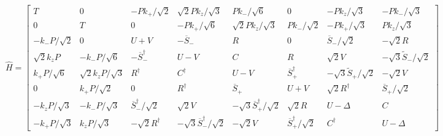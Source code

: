 \documentclass[a4paper, 14pt, russian]{extreport}
\newcommand{\kp}{k_{+}}
\newcommand{\km}{k_{-}}
\newcommand{\kz}{k_{z}}
\newcommand{\stp}{\overline{S}_{+}}
\newcommand{\stm}{\overline{S}_{-}}
\newcommand{\swp}{\widetilde{S}_{+}}
\newcommand{\swm}{\widetilde{S}_{-}}
\begin{document}
\begin{equation}
    \hat{H} =
        \begin{bmatrix}
            T       &   0       & -  P \kp  /\sqrt{2}   & \sqrt{2} P \kz / \sqrt{3} & P\km /\sqrt{6}        &   0       & -P\kz /\sqrt{3}   &   -P\km / \sqrt{3}\\
            0       &   T       &   0                   &   -P\kp /\sqrt{6}         &   \sqrt{2} P\kz / \sqrt{3}    &   P\km /\sqrt{2}  &   -P\kp / \sqrt{3}    & P\kz/\sqrt{3}\\
            -\km P/\sqrt{2} & 0 & U + V & -\stm & R &   0   & \stm / \sqrt{2}   & -\sqrt{2} R\\
            \sqrt{2} \kz P  & -\km P /\sqrt{6}  &   -\stm^\dagger   & U-V   &   C   &   R   & \sqrt{2} V & -\sqrt{3} \swm /\sqrt{2}\\
            \kp P /\sqrt{6} & \sqrt{2} \kz P /\sqrt{3}  & R^\dagger & C^\dagger & U - V & \stp^\dagger  & - \sqrt{3} \swp /\sqrt{2} & - \sqrt{2} V\\
            0   &   \kp P /\sqrt{2} & 0 & R^\dagger & \stp  & U+V   & \sqrt{2} R^\dagger    & \stp/\sqrt{2}\\
            -\kz P /\sqrt{3}    & - \km P / \sqrt{3}    & \stm^\dagger /\sqrt{2}    & \sqrt{2} V    & - \sqrt{3} \stp^\dagger /\sqrt{2} & \sqrt{2} R    & U - \Delta    & C\\
            -\kp P /\sqrt{3}    & \kz P /\sqrt{3}   & - \sqrt{2} R^\dagger  & -\sqrt{3} \stm^\dagger /\sqrt{2}  & -\sqrt{2} V   & \stp^\dagger /\sqrt{2}    & C^\dagger & U - \Delta
        \end{bmatrix}
\end{equation} 
\end{document}
